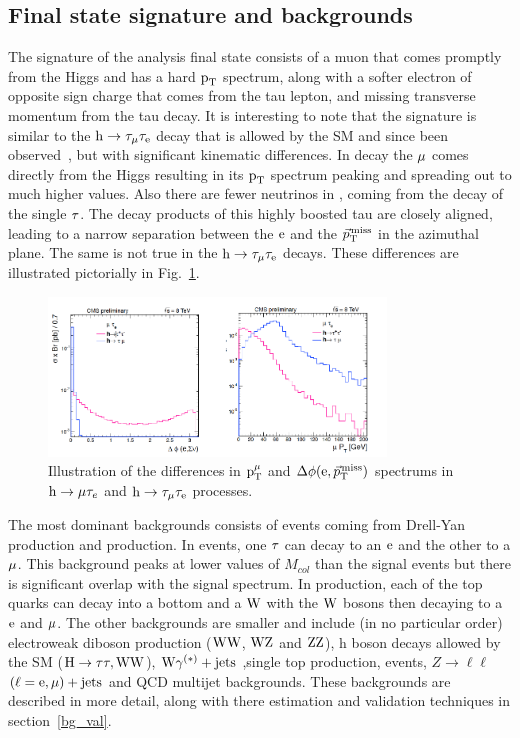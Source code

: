 \subsection{Final state signature and backgrounds}
\label{h125_signature}
The signature of the \hmue analysis final state consists of a muon that comes promptly from the Higgs and has a hard $\text{p}_\text{T}$ spectrum, along with a softer electron of opposite sign charge that comes from the tau lepton, and missing transverse momentum from the tau decay. It is interesting to note that the signature is similar to the $\text{h} \to \tau_{\mu}\tau_{\text{e}}$ decay that is allowed by the SM and since been observed~\cite{}, but with significant kinematic differences. In \hmue decay the $\mu$ comes directly from the Higgs resulting in its $\text{p}_\text{T}$ spectrum peaking and spreading out to much higher values. Also there are fewer neutrinos in \hmue, coming from the decay of the single $\tau$. The decay products of this highly boosted tau are closely aligned, leading to a narrow separation between the $\text{e}$ and the ${\vec p}_{\mathrm{T}}^{\kern1pt\text{miss}}$ in the azimuthal plane. The same is not true in the $\text{h} \to \tau_{\mu}\tau_{\text{e}}$ decays. These differences are illustrated pictorially in Fig.~\ref{fig:htt_v_lfv}.






\begin{figure}
\begin{center}
\includegraphics[width=0.8\textwidth,keepaspectratio]{plots_and_figures/chapter5/htt_v_lfv.pdf}
\caption{Illustration of the differences in $\text{p}_\text{T}^{\mu}$ and $\Delta\phi(\text{e}, {\vec p}_{\mathrm{T}}^{\kern1pt\text{miss}})$ spectrums in $\text{h} \to \mu \tau_{e}$ and $\text{h} \to \tau_{\mu}\tau_{\text{e}}$ processes.}
\label{fig:htt_v_lfv}
\end{center}
\end{figure}

The most dominant backgrounds consists of \ztt events coming from Drell-Yan production and \ttb production. In \ztt events, one $\tau$ can decay to an $\text{e}$ and the other to a $\mu$. This background peaks at lower values of $M_{col}$ than the signal events but there is significant overlap with the signal spectrum. In \ttb production, each of the top quarks can decay into a bottom and a $\text{W}$ with the $\text{W}$ bosons then decaying to a $\text{e}$ and $\mu$. The other backgrounds are smaller and include (in no particular order) electroweak diboson production ($\text{W}\text{W}$, $\text{W}\text{Z}$ and $\text{Z}\text{Z}$), h boson decays allowed by the SM ($\text{H} \to \tau\tau,\text{W}\text{W}$), $\text{W}\gamma^{(*)}+\text{jets}$ ,single top production, \wjets events, $Z\to\ell\ell$ $(\ell = \text{e}, \mu)+\text{jets}$ and QCD multijet backgrounds. These backgrounds are described in more detail, along with there estimation and validation techniques in section~\ref{bg_val}.        


